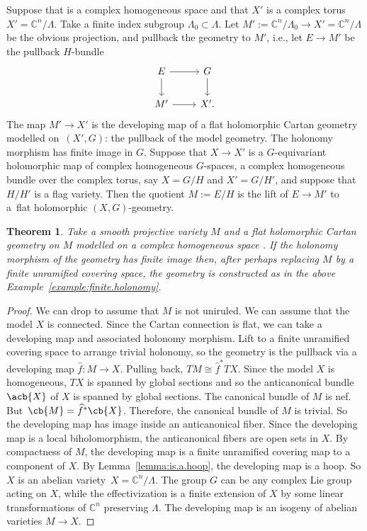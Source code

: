 \documentclass[pdftex]{sigma}
\numberwithin{equation}{section}
\newtheorem{Theorem}{Theorem}[section]
\renewcommand{\C}{\mathbb{C}}
\begin{document}
\begin{Example}\label{example:finite.holonomy}
Suppose that  is a complex homogeneous space and that $X'$ is a complex torus $X' = \C^{n}/\Lambda$.
Take a finite index subgroup $\Lambda_0 \subset \Lambda$.
Let $M' := \C^{n}/\Lambda_0 \to X' = \C^{n}/\Lambda$ be the obvious projection, and pullback the geometry to $M'$, i.e., let $E \longrightarrow
 M'$ be the pullback $H$-bundle
\[
\begin{tikzcd}
E \arrow{r}\arrow{d} & G \arrow{d} \\
M' \arrow{r} & X'.
\end{tikzcd}
\]
The map $M' \longrightarrow
 X'$ is the developing map of a flat holomorphic Cartan geometry modelled on~$(X', G)$: the pullback of the model geometry.
The holonomy morphism has finite image in $G$.
Suppose that $X \to X'$ is a $G$-equivariant holomorphic map of complex homogeneous $G$-spaces, a complex
homogeneous bundle over the complex torus, say $X = G/H$ and $X' = G/H'$, and suppose that $H/H'$ is a flag variety.
Then the quotient $M := E/H$ is the lift of $E \to M'$ to a~flat holomorphic $(X, G)$-geometry.
\end{Example}

\begin{Theorem}\label{theorem:finite.holonomy}
Take a smooth projective variety $M$ and a flat holomorphic Cartan geometry on $M$ modelled on a complex homogeneous space .
If the holonomy morphism of the geometry has finite image then, after perhaps replacing $M$ by a finite unramified covering space, the geometry is constructed as in the above Example~{\rm \ref{example:finite.holonomy}}.
\end{Theorem}

\begin{proof}
We can drop to assume that $M$ is not uniruled.
We can assume that the model $X$ is connected.
Since the Cartan connection is flat, we can take a developing map and associated holonomy morphism.
Lift to a finite unramified covering space to arrange trivial holonomy, so the geometry is the pullback via a developing map
$\widehat{f} \colon M \to X$.
Pulling back, ${TM \cong \widehat{f}^* TX}$.
Since the model $X$ is homogeneous, $TX$ is spanned by global sections and so the anticanonical bundle~$\acb{X}$ of $X$ is spanned by global sections.
The canonical bundle of $M$ is nef.
But~${\cb{M} = \widehat{f}^* \cb{X}}$.
Therefore, the canonical bundle of $M$ is trivial.
So the developing map has image inside an anticanonical fiber.
Since the developing map is a local biholomorphism, the anticanonical fibers are open sets in $X$.
By compactness of $M$, the developing map is a finite unramified covering map to a component of $X$.
By Lemma~\ref{lemma:is.a.hoop}, the developing map is a hoop.
So $X$ is an abelian variety~${X = \C^{n}/\Lambda}$.
The group $G$ can be any complex Lie group acting on $X$, while the effectivization is a finite extension of $X$ by some linear transformations of $\C^{n}$ preserving $\Lambda$.
The developing map is an isogeny of abelian varieties $M \to X$.
\end{proof}
\end{document}
